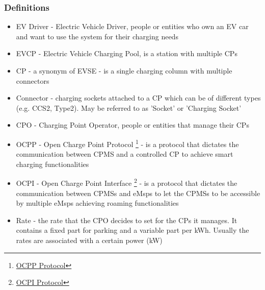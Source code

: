 \subsubsection{Definitions}
\begin{itemize}
    \item EV Driver - Electric Vehicle Driver, people or entities who own an EV car and want to use the system for their charging needs
    \item EVCP - Electric Vehicle Charging Pool, is a station with multiple CPs
    \item CP - a synonym of EVSE - is a single charging column with multiple connectors
    \item Connector - charging sockets attached to a CP which can be of different types (e.g. CCS2, Type2). May be referred to as 'Socket' or 'Charging Socket'
    \item CPO - Charging Point Operator, people or entities that manage their CPs
    \item OCPP - Open Charge Point Protocol \footnote{\href{https://www.openchargealliance.org/protocols/ocpp-201/}{OCPP Protocol}} - is a protocol that dictates the communication between CPMS and a controlled CP to achieve smart charging functionalities
    \item OCPI - Open Charge Point Interface \footnote{\href{https://evroaming.org/ocpi-background/}{OCPI Protocol}} - is a protocol that dictates the communication between CPMSs and eMsps to let the CPMSs to be accessible by multiple eMsps achieving roaming functionalities
    \item Rate - the rate that the CPO decides to set for the CPs it manages. It contains a fixed part for parking and a variable part per kWh. Usually the rates are associated with a certain power (kW)
\end{itemize}

